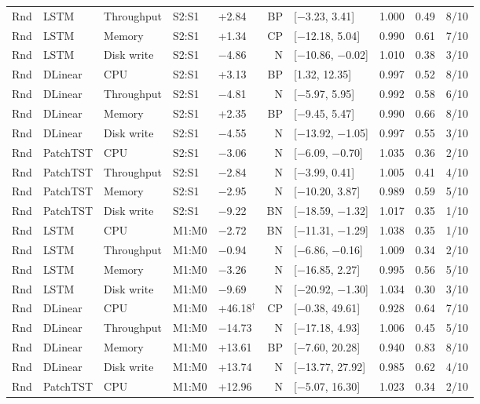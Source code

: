 \begin{longtable}{@{}lllllrlrrr@{}}
Rnd & LSTM & Throughput & S2:S1 & +2.84 & BP & [$-$3.23, 3.41] & 1.000 & 0.49 & 8/10 \\
Rnd & LSTM & Memory & S2:S1 & +1.34 & CP & [$-$12.18, 5.04] & 0.990 & 0.61 & 7/10 \\
Rnd & LSTM & Disk write & S2:S1 & $-$4.86 & N & [$-$10.86, $-$0.02] & 1.010 & 0.38 & 3/10 \\
Rnd & DLinear & CPU & S2:S1 & +3.13 & BP & [1.32, 12.35] & 0.997 & 0.52 & 8/10 \\
Rnd & DLinear & Throughput & S2:S1 & $-$4.81 & N & [$-$5.97, 5.95] & 0.992 & 0.58 & 6/10 \\
Rnd & DLinear & Memory & S2:S1 & +2.35 & BP & [$-$9.45, 5.47] & 0.990 & 0.66 & 8/10 \\
Rnd & DLinear & Disk write & S2:S1 & $-$4.55 & N & [$-$13.92, $-$1.05] & 0.997 & 0.55 & 3/10 \\
Rnd & PatchTST & CPU & S2:S1 & $-$3.06 & N & [$-$6.09, $-$0.70] & 1.035 & 0.36 & 2/10 \\
Rnd & PatchTST & Throughput & S2:S1 & $-$2.84 & N & [$-$3.99, 0.41] & 1.005 & 0.41 & 4/10 \\
Rnd & PatchTST & Memory & S2:S1 & $-$2.95 & N & [$-$10.20, 3.87] & 0.989 & 0.59 & 5/10 \\
Rnd & PatchTST & Disk write & S2:S1 & $-$9.22 & BN & [$-$18.59, $-$1.32] & 1.017 & 0.35 & 1/10 \\
Rnd & LSTM & CPU & M1:M0 & $-$2.72 & BN & [$-$11.31, $-$1.29] & 1.038 & 0.35 & 1/10 \\
Rnd & LSTM & Throughput & M1:M0 & $-$0.94 & N & [$-$6.86, $-$0.16] & 1.009 & 0.34 & 2/10 \\
Rnd & LSTM & Memory & M1:M0 & $-$3.26 & N & [$-$16.85, 2.27] & 0.995 & 0.56 & 5/10 \\
Rnd & LSTM & Disk write & M1:M0 & $-$9.69 & N & [$-$20.92, $-$1.30] & 1.034 & 0.30 & 3/10 \\
Rnd & DLinear & CPU & M1:M0 & +46.18$^{\dagger}$ & CP & [$-$0.38, 49.61] & 0.928 & 0.64 & 7/10 \\
Rnd & DLinear & Throughput & M1:M0 & $-$14.73 & N & [$-$17.18, 4.93] & 1.006 & 0.45 & 5/10 \\
Rnd & DLinear & Memory & M1:M0 & +13.61 & BP & [$-$7.60, 20.28] & 0.940 & 0.83 & 8/10 \\
Rnd & DLinear & Disk write & M1:M0 & +13.74 & N & [$-$13.77, 27.92] & 0.985 & 0.62 & 4/10 \\
Rnd & PatchTST & CPU & M1:M0 & +12.96 & N & [$-$5.07, 16.30] & 1.023 & 0.34 & 2/10 \\

\end{longtable}
